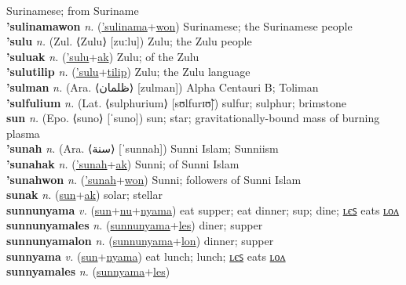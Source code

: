 Surinamese; from Suriname \label{'sulinamaak} \\
\textbf{'sulinamawon} \textit{n.} (\hyperref['sulinama]{'sulinama}+\hyperref[won]{won})
Surinamese; the Surinamese people \label{'sulinamawon} \\
\textbf{'sulu} \textit{n.} (Zul. ⟨Zulu⟩ [zuːlu])
Zulu; the Zulu people \label{'sulu} \\
\textbf{'suluak} \textit{n.} (\hyperref['sulu]{'sulu}+\hyperref[ak]{ak})
Zulu; of the Zulu \label{'suluak} \\
\textbf{'sulutilip} \textit{n.} (\hyperref['sulu]{'sulu}+\hyperref[tilip]{tilip})
Zulu; the Zulu language \label{'sulutilip} \\
\textbf{'sulman} \textit{n.} (Ara. ⟨ظلمان⟩ [zulman])
Alpha Centauri B; Toliman \label{'sulman} \\
\textbf{'sulfulium} \textit{n.} (Lat. ⟨sulphurium⟩ [sʊlfurɪʊ̃])
sulfur; sulphur; brimstone \label{'sulfulium} \\
\textbf{sun} \textit{n.} (Epo. ⟨suno⟩ [ˈsuno])
sun; star; gravitationally-bound mass of burning plasma \label{sun} \\
\textbf{'sunah} \textit{n.} (Ara. ⟨سنة⟩ [ˈsunnah])
Sunni Islam; Sunniism \label{'sunah} \\
\textbf{'sunahak} \textit{n.} (\hyperref['sunah]{'sunah}+\hyperref[ak]{ak})
Sunni; of Sunni Islam \label{'sunahak} \\
\textbf{'sunahwon} \textit{n.} (\hyperref['sunah]{'sunah}+\hyperref[won]{won})
Sunni; followers of Sunni Islam \label{'sunahwon} \\
\textbf{sunak} \textit{n.} (\hyperref[sun]{sun}+\hyperref[ak]{ak})
solar; stellar \label{sunak} \\
\textbf{sunnunyama} \textit{v.} (\hyperref[sun]{sun}+\hyperref[nu]{nu}+\hyperref[nyama]{nyama})
eat supper; eat dinner; sup; dine; \hyperref[sunnunyamales]{ʟєꜱ} eats \hyperref[sunnunyamalon]{ʟᴏᴧ} \label{sunnunyama} \\
\textbf{sunnunyamales} \textit{n.} (\hyperref[sunnunyama]{sunnunyama}+\hyperref[les]{les})
diner; supper \label{sunnunyamales} \\
\textbf{sunnunyamalon} \textit{n.} (\hyperref[sunnunyama]{sunnunyama}+\hyperref[lon]{lon})
dinner; supper \label{sunnunyamalon} \\
\textbf{sunnyama} \textit{v.} (\hyperref[sun]{sun}+\hyperref[nyama]{nyama})
eat lunch; lunch; \hyperref[sunnyamales]{ʟєꜱ} eats \hyperref[sunnyamalon]{ʟᴏᴧ} \label{sunnyama} \\
\textbf{sunnyamales} \textit{n.} (\hyperref[sunnyama]{sunnyama}+\hyperref[les]{les})
